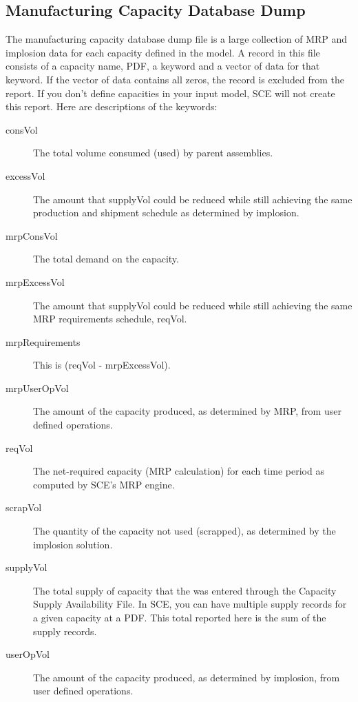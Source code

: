 \subsection{Manufacturing Capacity Database Dump}
The manufacturing capacity database dump file is a large collection of
MRP and implosion data for each capacity defined in the model.  A
record in this file consists of a capacity name, PDF, a keyword and a
vector of data for that keyword.  If the vector of data contains all
zeros, the record is excluded from the report.  If you don't define
capacities in your input model, SCE will not create this report.  Here
are descriptions of the keywords:
\begin{description}
\item[consVol]
The total volume consumed (used) by parent assemblies.  

\item[excessVol]
The amount that supplyVol could be reduced while still 
achieving the same production and shipment schedule as determined by
implosion.
 
\item[mrpConsVol]
The total demand on the capacity.
 
\item[mrpExcessVol]
The amount that supplyVol could be reduced while still 
achieving the same MRP requirements schedule, reqVol. 
 
\item[mrpRequirements]
This is (reqVol - mrpExcessVol).  
 
\item[mrpUserOpVol]
The amount of the capacity produced, as determined by MRP, from user
defined operations.
 
\item[reqVol]
The net-required capacity (MRP calculation)
for each time period as computed by SCE's MRP engine.
 
\item[scrapVol]
The quantity of the capacity not used (scrapped), as determined by the
implosion solution.
 
\item[supplyVol]
The total supply of capacity that the was entered through the Capacity
Supply Availability File.  In SCE, you can have multiple supply
records for a given capacity at a PDF.  This total reported here is the sum
of the supply records.
 
\item[userOpVol]
The amount of the capacity produced, as determined by implosion, from
user defined operations.
\end{description}

